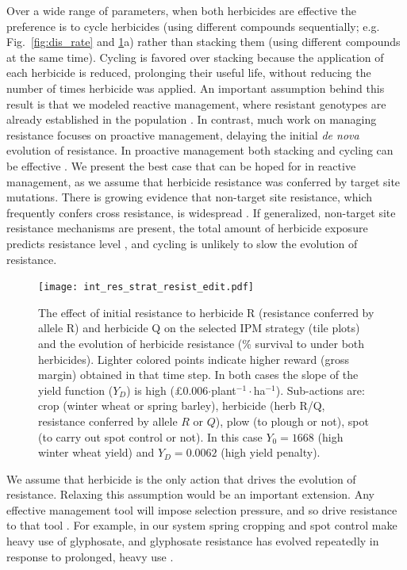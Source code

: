 \documentclass[9pt,twocolumn,twoside,lineno]{pnas-new}
\begin{document}
Over a wide range of parameters, when both herbicides are effective the preference is to cycle herbicides (using different compounds sequentially; e.g. Fig.\ \ref{fig:dis_rate} and \ref{fig:int_res}a) rather than stacking them (using different compounds at the same time). Cycling is favored over stacking because the application of each herbicide is reduced, prolonging their useful life, without reducing the number of times herbicide was applied. An important assumption behind this result is that we modeled reactive management, where resistant genotypes are already established in the population \citep{Hick2018}. In contrast, much work on managing resistance focuses on proactive management, delaying the initial \textit{de nova} evolution of resistance. In proactive management both stacking and cycling can be effective \citep{REX2013}. We present the best case that can be hoped for in reactive management, as we assume that herbicide resistance was conferred by target site mutations. There is growing evidence that non-target site resistance, which frequently confers cross resistance, is widespread \citep{Hick2018}. If generalized, non-target site resistance mechanisms are present, the total amount of herbicide exposure predicts resistance level \citep{Hick2018}, and cycling is unlikely to slow the evolution of resistance. 
\begin{figure}[!ht]
	\texttt{[image: int\_res\_strat\_resist\_edit.pdf]}
	\caption{The effect of initial resistance to herbicide R (resistance conferred by allele R) and herbicide Q on the selected IPM strategy (tile plots) and the evolution of herbicide resistance (\% survival to under both herbicides). Lighter colored points indicate higher reward (gross margin) obtained in that time step. In both cases the slope of the yield function ($Y_D$) is high (\pounds 0.006$\cdot$plant$^{-1}\cdot$ha$^{-1}$). Sub-actions are: crop (winter wheat or spring barley), herbicide (herb R/Q, resistance conferred by allele $R$ or $Q$), plow (to plough or not), spot (to carry out spot control or not). In this case $Y_0 = 1668$ (high winter wheat yield) and $Y_D = 0.0062$ (high yield penalty).}
	\label{fig:int_res} 
\end{figure}

We assume that herbicide is the only action that drives the evolution of resistance. Relaxing this assumption would be an important extension. Any effective management tool will impose selection pressure, and so drive resistance to that tool \citep{Jord1997}. For example, in our system spring cropping and spot control make heavy use of glyphosate, and glyphosate resistance has evolved repeatedly in response to prolonged, heavy use \citep{Samm2014}. 
\end{document}
